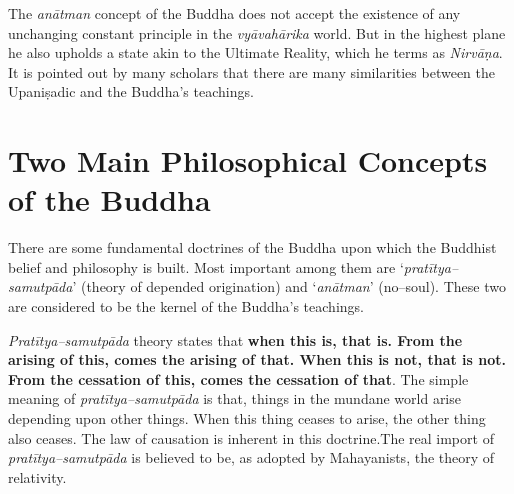 The \textit{anātman} concept of the Buddha does not accept the existence of any unchanging constant principle in the \textit{vyāvahārika} world. But in the highest plane he also upholds a state akin to the Ultimate Reality, which he terms as \textit{Nirvāṇa}. It is pointed out by many scholars that there are many similarities between the Upaniṣadic and the Buddha’s teachings.


\section*{Two Main Philosophical Concepts of the Buddha}

There are some fundamental doctrines of the Buddha upon which the Buddhist belief and philosophy is built. Most important among them are ‘\textit{pratītya–samutpāda}’ (theory of depended origination) and ‘\textit{anātman}’ (no–soul). These two are considered to be the kernel of the Buddha’s teachings.

\textit{Pratītya–samutpāda} theory states that \textbf{when this is, that is. From the arising of this, comes the arising of that. When this is not, that is not. From the cessation of this, comes the cessation of that}. The simple meaning of \textit{pratītya–samutpāda} is that, things in the mundane world arise depending upon other things. When this thing ceases to arise, the other thing also ceases. The law of causation is inherent in this doctrine.The real import of \textit{pratītya–samutpāda} is believed to be, as adopted by Mahayanists, the theory of relativity.


